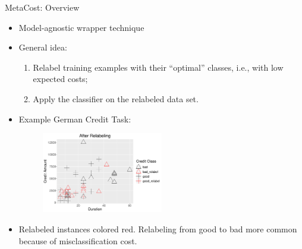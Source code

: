 \documentclass[11pt,compress,t,notes=noshow, xcolor=table]{beamer}
\begin{document}
\begin{vbframe}{MetaCost: Overview}

        \begin{itemize}
        \small
            \item Model-agnostic wrapper technique                      
            \item General idea: 
                \begin{enumerate}
                \small
                    \item Relabel training examples with their ``optimal'' classes, i.e., with low expected costs;
                   
                    \item Apply the classifier on the relabeled data set.
                \end{enumerate} 
                \item Example German Credit Task:
                                \begin{figure}[h]
            \centering
            \includegraphics[width=0.5\textwidth]{figure_man/relabeling_viz.pdf}
        \end{figure}
                \item Relabeled instances colored red. Relabeling from good to bad more common because of misclassification cost.
        \end{itemize}

\end{vbframe}
\end{document}

